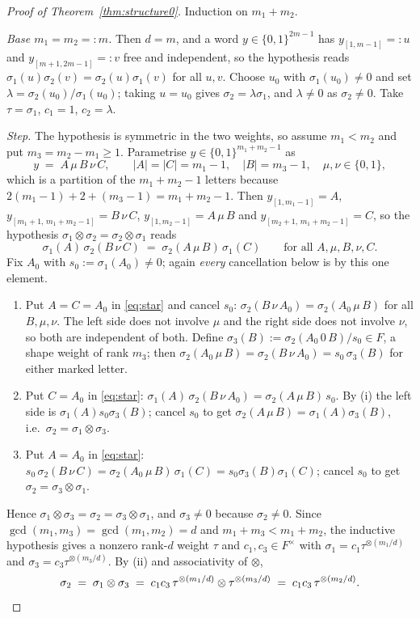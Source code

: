 \documentclass[11pt]{article}
\theoremstyle{definition}
\theoremstyle{remark}
\begin{document}
\begin{proof}[Proof of Theorem~\ref{thm:structure0}]
Induction on $m_1+m_2$.

\emph{Base $m_1=m_2=:m$.}  Then $d=m$, and a word $y\in\{0,1\}^{2m-1}$ has
$y_{[1,m-1]}=:u$ and $y_{[m+1,2m-1]}=:v$ free and independent, so the hypothesis reads
$\sigma_1(u)\sigma_2(v)=\sigma_2(u)\sigma_1(v)$ for all $u,v$.  Choose $u_0$ with
$\sigma_1(u_0)\ne0$ and set $\lambda=\sigma_2(u_0)/\sigma_1(u_0)$; taking $u=u_0$ gives
$\sigma_2=\lambda\sigma_1$, and $\lambda\ne0$ as $\sigma_2\ne0$.  Take $\tau=\sigma_1$,
$c_1=1$, $c_2=\lambda$.

\emph{Step.}  The hypothesis is symmetric in the two weights, so assume $m_1<m_2$ and put
$m_3=m_2-m_1\ge1$.  Parametrise $y\in\{0,1\}^{m_1+m_2-1}$ as
\[
   y \;=\; A\,\mu\,B\,\nu\,C,\qquad
   |A|=|C|=m_1-1,\quad |B|=m_3-1,\quad \mu,\nu\in\{0,1\},
\]
which is a partition of the $m_1+m_2-1$ letters because
$2(m_1-1)+2+(m_3-1)=m_1+m_2-1$.  Then $y_{[1,m_1-1]}=A$,
$y_{[m_1+1,\,m_1+m_2-1]}=B\,\nu\,C$, $y_{[1,m_2-1]}=A\,\mu\,B$ and
$y_{[m_2+1,\,m_1+m_2-1]}=C$, so the hypothesis $\sigma_1\otimes\sigma_2
=\sigma_2\otimes\sigma_1$ reads
\begin{equation}\label{eq:star}
   \sigma_1(A)\,\sigma_2(B\,\nu\,C)\;=\;\sigma_2(A\,\mu\,B)\,\sigma_1(C)
   \qquad\text{for all }A,\mu,B,\nu,C .
\end{equation}
Fix $A_0$ with $s_0:=\sigma_1(A_0)\ne0$; again \emph{every} cancellation below is by this
one element.
\begin{enumerate}
\item[(i)] Put $A=C=A_0$ in \eqref{eq:star} and cancel $s_0$:
  $\sigma_2(B\,\nu\,A_0)=\sigma_2(A_0\,\mu\,B)$ for all $B,\mu,\nu$.  The left side does not
  involve $\mu$ and the right side does not involve $\nu$, so both are independent of both.
  Define $\sigma_3(B):=\sigma_2(A_0\,0\,B)/s_0\in F$, a shape weight of rank $m_3$; then
  $\sigma_2(A_0\,\mu\,B)=\sigma_2(B\,\nu\,A_0)=s_0\,\sigma_3(B)$ for either marked letter.
\item[(ii)] Put $C=A_0$ in \eqref{eq:star}: $\sigma_1(A)\,\sigma_2(B\,\nu\,A_0)
  =\sigma_2(A\,\mu\,B)\,s_0$.  By (i) the left side is $\sigma_1(A)s_0\sigma_3(B)$; cancel
  $s_0$ to get $\sigma_2(A\,\mu\,B)=\sigma_1(A)\sigma_3(B)$, i.e.\
  $\sigma_2=\sigma_1\otimes\sigma_3$.
\item[(iii)] Put $A=A_0$ in \eqref{eq:star}: $s_0\,\sigma_2(B\,\nu\,C)
  =\sigma_2(A_0\,\mu\,B)\,\sigma_1(C)=s_0\sigma_3(B)\sigma_1(C)$; cancel $s_0$ to get
  $\sigma_2=\sigma_3\otimes\sigma_1$.
\end{enumerate}
Hence $\sigma_1\otimes\sigma_3=\sigma_2=\sigma_3\otimes\sigma_1$, and $\sigma_3\ne0$
because $\sigma_2\ne0$.  Since $\gcd(m_1,m_3)=\gcd(m_1,m_2)=d$ and
$m_1+m_3<m_1+m_2$, the inductive hypothesis gives a nonzero rank-$d$ weight $\tau$ and
$c_1,c_3\in F^\times$ with $\sigma_1=c_1\tau^{\otimes(m_1/d)}$ and
$\sigma_3=c_3\tau^{\otimes(m_3/d)}$.  By (ii) and associativity of $\otimes$,
\[
   \sigma_2\;=\;\sigma_1\otimes\sigma_3\;=\;c_1c_3\,
   \tau^{\otimes(m_1/d)}\otimes\tau^{\otimes(m_3/d)}
   \;=\;c_1c_3\,\tau^{\otimes(m_2/d)} . \qedhere
\]
\end{proof}
\end{document}
